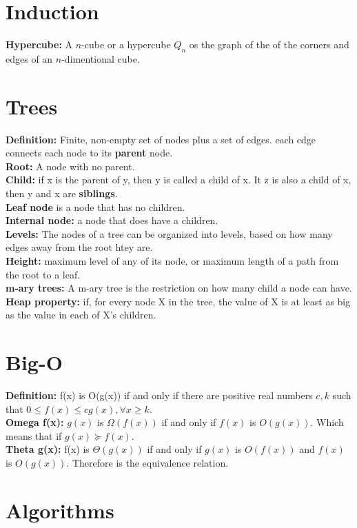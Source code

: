\documentclass[a4paper]{article}
\begin{document}
\section{Induction}
{\bf Hypercube:} A $n$-cube or a hypercube $Q_n$ os the graph of the of the corners and edges of an $n$-dimentional cube.\\
\section{Trees}
{\bf Definition:} Finite, non-empty set of nodes plus a set of edges. each edge connects each node to its {\bf parent} node.\\
{\bf Root:} A node with no parent.\\
{\bf Child:} if x is the parent of y, then y is called a child of x. It z is also a child of x, then y and x are {\bf siblings}.\\
{\bf Leaf node} is a node that has no children.\\
{\bf Internal node:} a node that does have a children.\\
{\bf Levels:} The nodes of a tree can be organized into levels, based on how many edges away from the root htey are.\\
{\bf Height:} maximum level of any of its node, or maximum length of a path from the root to a leaf.\\
{\bf m-ary trees:} A m-ary tree is the restriction on how many child a node can have.\\
{\bf Heap property:} if, for every node X in the tree, the value of X is at least as big as the value in each of X's children.

\section{ Big-O}
{\bf Definition:} f(x) is O(g(x)) if and only if there are positive real numbers $c,k$ such that $0\leq f(x) \leq cg(x), \forall x\geq k$.\\
{\bf Omega f(x):} $g(x)$ is $\Omega (f(x))$ if and only if $f(x)$ is $O(g(x))$. Which means that if $g(x) \succeq f(x)$.\\
{\bf Theta g(x):} f(x) is $\Theta (g(x))$ if and only if $g(x)$ is $O(f(x))$ and $f(x)$ is $O(g(x))$. Therefore is the equivalence relation.
\section{Algorithms}
\end{document}
